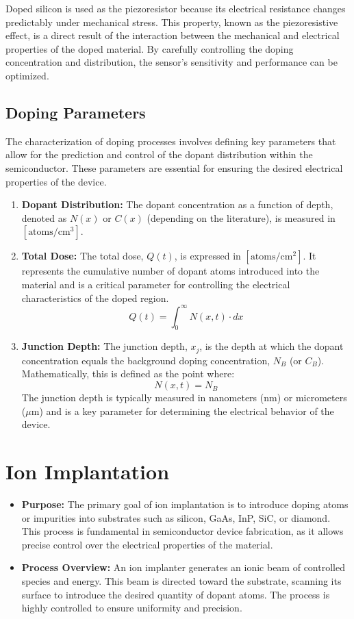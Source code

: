 \documentclass{report}
\begin{document}
Doped silicon is used as the piezoresistor because its electrical resistance changes predictably under mechanical stress. This property, known as the piezoresistive effect, is a direct result of the interaction between the mechanical and electrical properties of the doped material. By carefully controlling the doping concentration and distribution, the sensor's sensitivity and performance can be optimized.

\subsection{Doping Parameters}
The characterization of doping processes involves defining key parameters that allow for the prediction and control of the dopant distribution within the semiconductor. These parameters are essential for ensuring the desired electrical properties of the device.

\begin{enumerate}
    \item \textbf{Dopant Distribution:} The dopant concentration as a function of depth, denoted as $N(x)$ or $C(x)$ (depending on the literature), is measured in $[\text{atoms}/\text{cm}^3]$. 

    \item \textbf{Total Dose:} The total dose, $Q(t)$, is expressed in $[\text{atoms}/\text{cm}^2]$. It represents the cumulative number of dopant atoms introduced into the material and is a critical parameter for controlling the electrical characteristics of the doped region.
    $$
    Q(t) = \int_{0}^{\infty} N(x, t) \cdot dx
    $$


    \item \textbf{Junction Depth:} The junction depth, $x_j$, is the depth at which the dopant concentration equals the background doping concentration, $N_B$ (or $C_B$). Mathematically, this is defined as the point where:
    $$
    N(x, t) = N_B
    $$
    The junction depth is typically measured in nanometers ($\text{nm}$) or micrometers ($\mu\text{m}$) and is a key parameter for determining the electrical behavior of the device.
\end{enumerate}

\section{Ion Implantation}
\begin{itemize}
    \item \textbf{Purpose:} The primary goal of ion implantation is to introduce doping atoms or impurities into substrates such as silicon, GaAs, InP, SiC, or diamond. This process is fundamental in semiconductor device fabrication, as it allows precise control over the electrical properties of the material.
    \item \textbf{Process Overview:} An ion implanter generates an ionic beam of controlled species and energy. This beam is directed toward the substrate, scanning its surface to introduce the desired quantity of dopant atoms. The process is highly controlled to ensure uniformity and precision.
\end{itemize}
\end{document}
